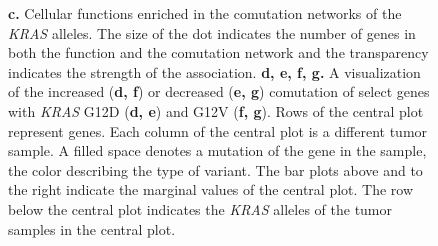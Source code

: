 \documentclass[english, 12pt, letterpaper]{article}
\newcommand{\KRAS}{\emph{KRAS}}
\begin{document}
\begin{figure}[p]
{    \textbf{c.} Cellular functions enriched in the comutation networks of the \KRAS{} alleles. The size of the dot indicates the number of genes in both the function and the comutation network and the transparency indicates the strength of the association.
    \textbf{d, e, f, g.} A visualization of the increased (\textbf{d, f}) or decreased (\textbf{e, g}) comutation of select genes with \KRAS{} G12D (\textbf{d, e}) and G12V (\textbf{f, g}). Rows of the central plot represent genes. Each column of the central plot is a different tumor sample. A filled space denotes a mutation of the gene in the sample, the color describing the type of variant. The bar plots above and to the right indicate the marginal values of the central plot. The row below the central plot indicates the \KRAS{} alleles of the tumor samples in the central plot.
}
\label{fig:coad-comutation-main}
\end{figure}
\end{document}

